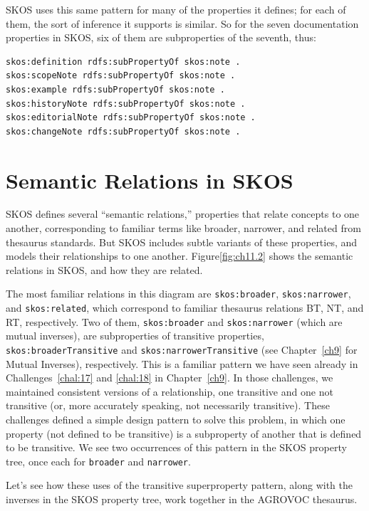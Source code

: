 SKOS uses this same pattern for many of the properties it defines; for
each of them, the sort of inference it supports is similar. So for the
seven documentation properties in SKOS, six of them are subproperties of
the seventh, thus:

\begin{lstlisting}
skos:definition rdfs:subPropertyOf skos:note .
skos:scopeNote rdfs:subPropertyOf skos:note .
skos:example rdfs:subPropertyOf skos:note .
skos:historyNote rdfs:subPropertyOf skos:note .
skos:editorialNote rdfs:subPropertyOf skos:note .
skos:changeNote rdfs:subPropertyOf skos:note .
\end{lstlisting}

\section{Semantic Relations in SKOS}

SKOS defines several ``semantic relations,'' properties that relate
concepts to one another, corresponding to familiar terms like broader,
narrower, and related from thesaurus standards. But SKOS includes subtle
variants of these properties, and models their relationships to one
another. Figure\ref{fig:ch11.2} shows the semantic relations in SKOS, and how they
are related.

The most familiar relations in this diagram are \texttt{skos:broader},
\texttt{skos:narrower}, and
\texttt{skos:related}, which correspond to familiar thesaurus relations BT, NT,
and RT, respectively. Two of them, \texttt{skos:broader} and \texttt{skos:narrower} (which
are mutual inverses), are subproperties of transitive properties,
\texttt{skos:broaderTransitive} and \texttt{skos:narrowerTransitive} (see Chapter~\ref{ch9} for
Mutual Inverses), respectively. This is a familiar pattern we have seen
already in Challenges~\ref{chal:17} and \ref{chal:18} in Chapter~\ref{ch9}. In those challenges, we
maintained consistent versions of a relationship, one transitive and one
not transitive (or, more accurately speaking, not necessarily
transitive). These challenges defined a simple design pattern to solve
this problem, in which one property (not defined to be transitive) is a
subproperty of another that is defined to be transitive. We see two
occurrences of this pattern in the SKOS property tree, once each for
\texttt{broader} and \texttt{narrower}.

Let's see how these uses of the transitive superproperty pattern, along
with the inverses in the
SKOS property tree, work together in the AGROVOC thesaurus.

